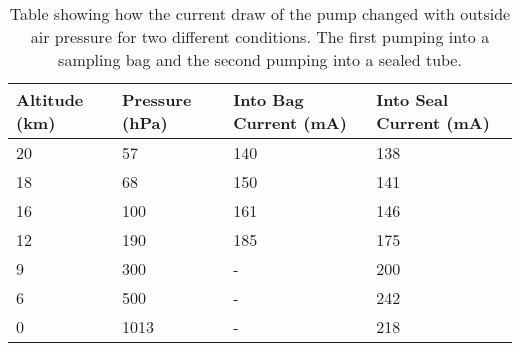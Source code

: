 \begin{table}[H]
\centering

\begin{tabular}{|l|l|l|l|}
\hline
Altitude (km) & Pressure (hPa) & Into Bag Current (mA) & Into Seal Current (mA) \\ \hline
20 & 57 & 140 & 138 \\ \hline
18 & 68 & 150 & 141 \\ \hline
16 & 100 & 161 & 146 \\ \hline
12 & 190 & 185 & 175 \\ \hline
9 & 300 & - & 200 \\ \hline
6 & 500 & - & 242 \\ \hline
0 & 1013 & - & 218 \\ \hline
\end{tabular}
\caption{Table showing how the current draw of the pump changed with outside air pressure for two different conditions. The first pumping into a sampling bag and the second pumping into a sealed tube.}
\label{tab:pumpcurrentpressure}
\end{table}